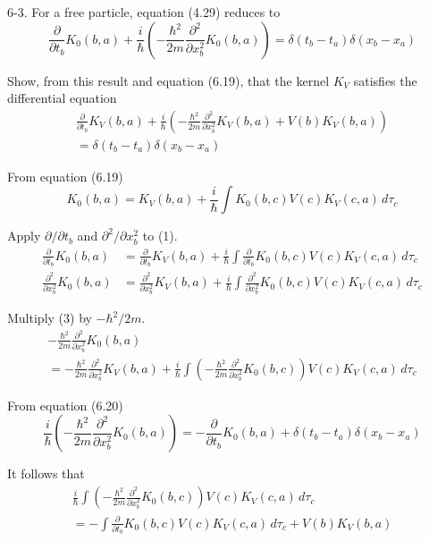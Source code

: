 \documentclass[12pt]{article}
\begin{document}
6-3.
For a free particle, equation (4.29) reduces to
\begin{equation*}
\frac{\partial}{\partial t_b}K_0(b,a)+\frac{i}{\hbar}
\left(-\frac{\hbar^2}{2m}\frac{\partial^2}{\partial x_b^2}K_0(b,a)\right)
=\delta(t_b-t_a)\delta(x_b-x_a)
\tag{6.20}
\end{equation*}

Show, from this result and equation (6.19), that the kernel
$K_V$ satisfies the differential equation
\begin{multline*}
\frac{\partial}{\partial t_b}K_V(b,a)+\frac{i}{\hbar}
\left(-\frac{\hbar^2}{2m}\frac{\partial^2}{\partial x_b^2}K_V(b,a)+V(b)K_V(b,a)\right)
\\
=\delta(t_b-t_a)\delta(x_b-x_a)
\tag{6.21}
\end{multline*}

From equation (6.19)
\begin{equation*}
K_0(b,a)=K_V(b,a)+\frac{i}{\hbar}
\int K_0(b,c)V(c)K_V(c,a)\,d\tau_c
\tag{1}
\end{equation*}

Apply $\partial/\partial t_b$ and $\partial^2/\partial x_b^2$ to (1).
\begin{align*}
\frac{\partial}{\partial t_b}K_0(b,a)
&=\frac{\partial}{\partial t_b}K_V(b,a)
+\frac{i}{\hbar}\int \frac{\partial}{\partial t_b}K_0(b,c)V(c)K_V(c,a)\,d\tau_c
\tag{2}
\\
\frac{\partial^2}{\partial x_b^2}K_0(b,a)
&=\frac{\partial^2}{\partial x_b^2}K_V(b,a)
+\frac{i}{\hbar}\int \frac{\partial^2}{\partial x_b^2}K_0(b,c)V(c)K_V(c,a)\,d\tau_c
\tag{3}
\end{align*}

Multiply (3) by $-\hbar^2/2m$.
\begin{multline*}
-\frac{\hbar^2}{2m}\frac{\partial^2}{\partial x_b^2}K_0(b,a)
\\
=-\frac{\hbar^2}{2m}\frac{\partial^2}{\partial x_b^2}K_V(b,a)
+\frac{i}{\hbar}\int\left(-\frac{\hbar^2}{2m}\frac{\partial^2}{\partial x_b^2}K_0(b,c)\right)
V(c)K_V(c,a)\,d\tau_c
\tag{4}
\end{multline*}

From equation (6.20)
\begin{equation*}
\frac{i}{\hbar}\left(-\frac{\hbar^2}{2m}\frac{\partial^2}{\partial x_b^2}K_0(b,a)\right)
=
-\frac{\partial}{\partial t_b}K_0(b,a)
+\delta(t_b-t_a)\delta(x_b-x_a)
\end{equation*}

It follows that
\begin{multline*}
\frac{i}{\hbar}\int\left(-\frac{\hbar^2}{2m}\frac{\partial^2}{\partial x_b^2}K_0(b,c)\right)
V(c)K_V(c,a)\,d\tau_c
\\
=-\int\frac{\partial}{\partial t_b}K_0(b,c)V(c)K_V(c,a)\,d\tau_c
+V(b)K_V(b,a)
\tag{5}
\end{multline*}
\end{document}
